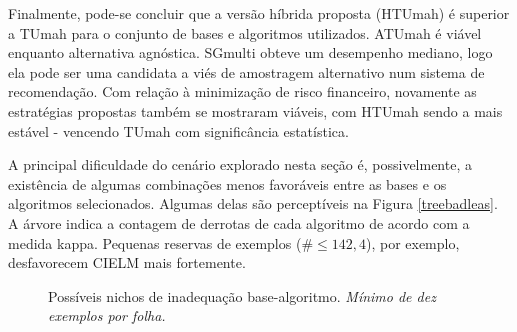 Finalmente, pode-se concluir que a versão híbrida proposta (HTUmah) é superior a TUmah
para o conjunto de bases e algoritmos utilizados.
ATUmah é viável enquanto alternativa agnóstica.
SGmulti obteve um desempenho mediano,
logo ela pode ser uma candidata a viés de amostragem alternativo num sistema de recomendação.
Com relação à minimização de risco financeiro, 
novamente as estratégias propostas também se mostraram viáveis,
com HTUmah sendo a mais estável - vencendo TUmah com significância estatística.




A principal dificuldade do cenário explorado nesta seção é, possivelmente, a existência de algumas
combinações menos favoráveis entre as bases e os algoritmos selecionados.
Algumas delas são perceptíveis na Figura \ref{treebadleas}.
A árvore indica a contagem de derrotas de cada algoritmo de acordo com a medida kappa.
Pequenas reservas de exemplos ($\#\leq142,4$),
por exemplo, desfavorecem CIELM mais fortemente.
\begin{figure}
\begin{center}
\caption{Possíveis nichos de inadequação base-algoritmo.
\textit{Mínimo de dez exemplos por folha.}}
\begin{tikzpicture} [edge from parent/.style={->,above,draw,sloped,midway,gray!30,ultra thick},
text width=2.7cm, align=flush center, grow cyclic,
level 1/.style={level distance=3.2cm,sibling angle=45},
level 2/.style={text width=2cm, font=\footnotesize, level distance=3.2cm,sibling angle=60},
level 3/.style={text width=2cm, font=\footnotesize, level distance=3.2cm,sibling angle=60},
level 4/.style={text width=2cm, font=\footnotesize, level distance=3.2cm,sibling angle=60},
level 5/.style={text width=2cm, font=\footnotesize, level distance=3.2cm,sibling angle=60},
]

\label{treebadleas}
\end{tikzpicture}
\end{center}
\end{figure}

